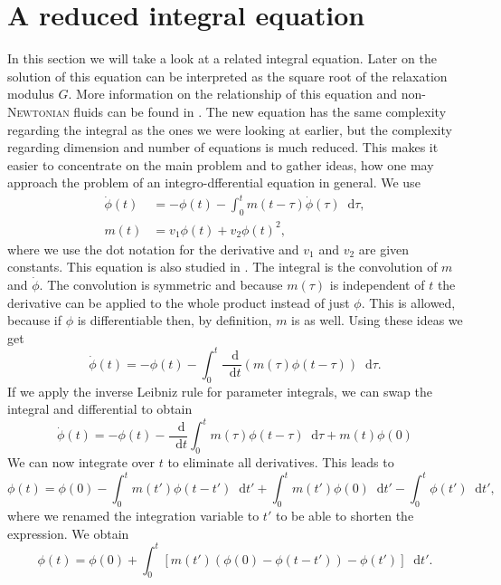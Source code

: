 \documentclass[12pt,a4paper,twoside, open=right]{scrreprt}
\theoremstyle{definition}
\theoremstyle{plain}
\newcommand{\D}{\mathop{}\!\mathrm{d}}
\begin{document}
\section{A reduced integral equation}
In this section we will take a look at a related integral equation. Later on the solution of this equation can be interpreted as the square root of the relaxation modulus $G$. More information on the relationship of this equation and non-\textsc{Newtonian} fluids can be found in \cite{Gnann2012}. The new equation has the same complexity regarding the integral as the ones we were looking at earlier, but the complexity regarding dimension and number of equations is much reduced. This makes it easier to concentrate on the main problem and to gather ideas, how one may approach the problem of an integro-dfferential equation in general. We use 
\begin{align}
   \dot\phi(t)&=-\phi(t)-\int_0^tm(t-\tau)\dot\phi(\tau)\D\tau,\\
   m(t)&=v_1\phi(t)+v_2\phi(t)^2,
\end{align}
where we use the dot notation for the derivative and $v_1$ and $v_2$ are given constants. This equation is also studied in \cite{Goetze1995}.
The integral is the convolution of $m$ and $\dot\phi$. The convolution is symmetric and because $m(\tau)$ is independent of $t$ the derivative can be applied to the whole product instead of just $\phi$. This is allowed, because if $\phi$ is differentiable then, by definition, $m$ is as well. Using these ideas we get
\begin{equation}
    \dot\phi(t)=-\phi(t)-\int_0^t\frac{\D}{\D t}(m(\tau)\phi(t-\tau))\D\tau.
\end{equation}
If we apply the inverse Leibniz rule for parameter integrals, we can swap the integral and differential to obtain
\begin{equation}
    \dot\phi(t)=-\phi(t) -\frac{\D}{\D t}\int_0^t m(\tau)\phi(t-\tau)\D\tau +m(t)\phi(0)
\end{equation}
We can now integrate over $t$ to eliminate all derivatives. This leads to 
\begin{equation}
    \phi(t)=\phi(0)-\int_0^tm(t')\phi(t-t')\D t' +\int_0^tm(t')\phi(0)\D t' -\int_0^t\phi(t')\D t',
\end{equation}
where we renamed the integration variable to $t'$ to be able to shorten the expression. We obtain
\begin{equation}
    \phi(t)=\phi(0)+\int_0^t[m(t')(\phi(0)-\phi(t-t'))-\phi(t')]\D t'.\label{eq:phianalytic}
\end{equation}
\end{document}
